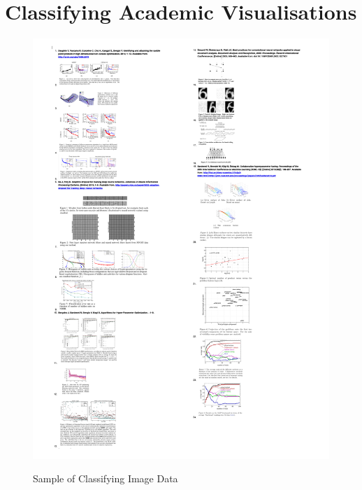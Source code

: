 \documentclass[a4paper,11pt,titlepage]{article}
\begin{document}
\clearpage




\appendix
	\section{Classifying Academic Visualisations}
		 \begin{figure}[H]
    			\centering	
	{{\includegraphics[width=16cm]
    				{img/explanation_research_02} 
    			}}%
    			\caption{Sample of Classifying Image Data}%
    		\label{fig:studentprofile}
		\end{figure}
\end{document}
